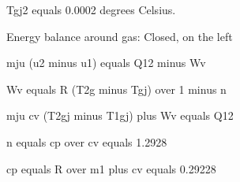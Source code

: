 Tgj2 equals 0.0002 degrees Celsius.

Energy balance around gas: Closed, on the left

mju (u2 minus u1) equals Q12 minus Wv

Wv equals R (T2g minus Tgj) over 1 minus n

mju cv (T2gj minus T1gj) plus Wv equals Q12

n equals cp over cv equals 1.2928

cp equals R over m1 plus cv equals 0.29228